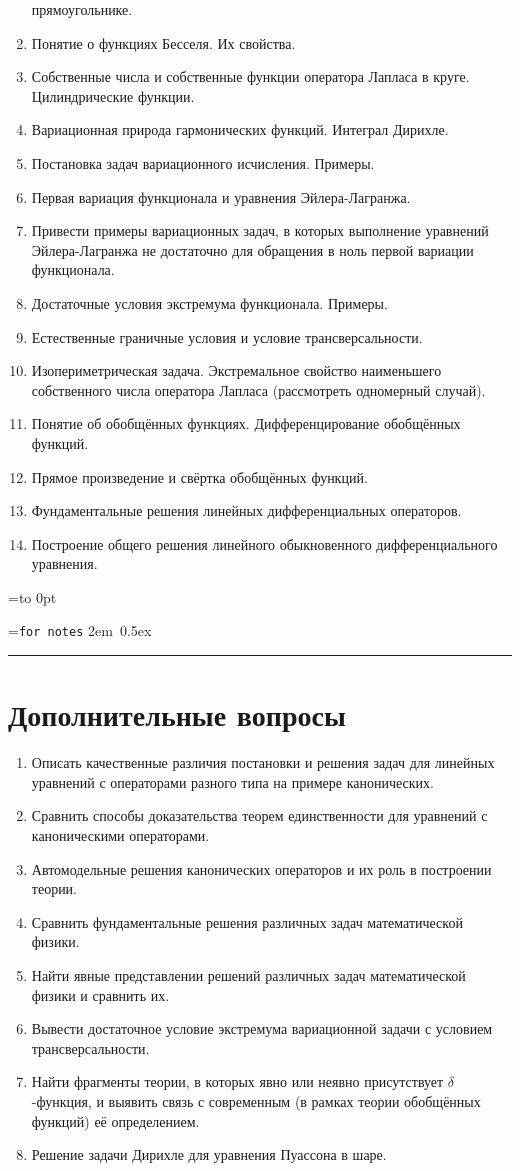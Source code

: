 \documentclass{trnotes}
\def\sidenotestitle#1{
  \setbox \sidetitlebox=\vbox to 0pt{%
    \setbox0=\hbox{\texttt{#1}}
    \hbox{\kern 2em \unhcopy0\kern 0.5ex}\vskip2pt\hrule
  }%
  \hfill\box \sidetitlebox%
}
\let \olditem = \item
\let \oldlabelenumi=\labelenumi%
\newcommand{\importantitem}{%
  \renewcommand{\labelenumi}{$\to$ \textbf{\oldlabelenumi}}%
  \olditem
}
\renewcommand{\item}{%
  \renewcommand{\labelenumi}{\oldlabelenumi}%
  \olditem
}
\begin{document}
\begin{enumerate}
  прямоугольнике.
\item  Понятие о функциях Бесселя. Их свойства.
\item  Собственные числа и собственные функции оператора Лапласа в круге.
  Цилиндрические функции.
\importantitem  Вариационная природа гармонических функций. Интеграл Дирихле.
\item  Постановка задач вариационного исчисления. Примеры.
\importantitem  Первая вариация функционала и уравнения Эйлера-Лагранжа.
\item  Привести примеры вариационных задач, в которых выполнение уравнений
  Эйлера-Лагранжа не достаточно для обращения в ноль первой вариации
  функционала.
\importantitem  Достаточные условия экстремума функционала. Примеры.
\item  Естественные граничные условия и условие трансверсальности.
\item  Изопериметрическая задача. Экстремальное свойство наименьшего
  собственного числа оператора Лапласа (рассмотреть одномерный случай).
\importantitem  Понятие об обобщённых функциях. Дифференцирование обобщённых функций.
\item  Прямое произведение и свёртка обобщённых функций.
\item  Фундаментальные решения линейных дифференциальных операторов.
\item  Построение общего решения линейного обыкновенного
  дифференциального уравнения.
\end{enumerate}
\newpage
\sidenotestitle{for notes}
\vspace{-2\baselineskip}%
\section*{Дополнительные вопросы}
\begin{enumerate}
\item Описать качественные различия постановки и решения задач для линейных
  уравнений с операторами разного типа на примере канонических.
\item  Сравнить способы доказательства теорем единственности для уравнений с
  каноническими операторами.
\item  Автомодельные решения канонических операторов и их роль в построении
  теории.
\item  Сравнить фундаментальные решения различных задач математической физики.
\item  Найти явные представлении решений различных задач математической физики
  и сравнить их.
\item  Вывести достаточное условие экстремума вариационной задачи с условием
  трансверсальности.
\item  Найти фрагменты теории, в которых явно или неявно присутствует
  $\delta$-функция, и выявить связь с современным (в рамках теории обобщённых
  функций) её определением.
\item  Решение задачи Дирихле для уравнения Пуассона в шаре.
\end{enumerate}
\end{document}
